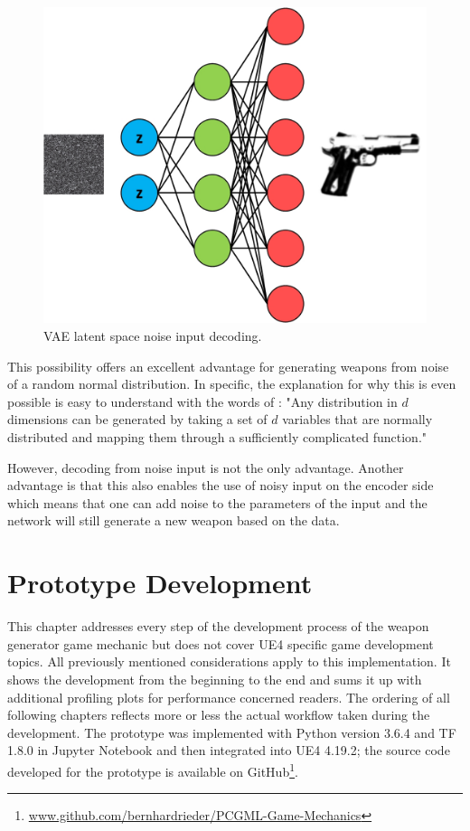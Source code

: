 \documentclass[MGS,Master,english]{twbook}%
\begin{document}
\begin{figure}[!htbp]
	\centering
	\includegraphics[width=0.7\linewidth]{PICs/NNs/variational_autoencoder_noise_decoding}
	\caption{\ac{VAE} latent space noise input decoding.} \label{fig::vae_noise_decoding}
\end{figure}

This possibility offers an excellent advantage for generating weapons from noise of a random normal distribution. In specific, the explanation for why this is even possible is easy to understand with the words of \citep[p. 6]{ml::vae::tutorial}: "Any distribution in $d$ dimensions can be generated by taking a set of $d$ variables that are normally distributed and mapping them through a sufficiently complicated function."

However, decoding from noise input is not the only advantage. Another advantage is that this also enables the use of noisy input on the encoder side which means that one can add noise to the parameters of the input and the network will still generate a new weapon based on the data. 


%
%
\clearpage
\chapter{Prototype Development}
This chapter addresses every step of the development process of the weapon generator game mechanic but does not cover \ac{UE4} specific game development topics. All previously mentioned considerations apply to this implementation. It shows the development from the beginning to the end and sums it up with additional profiling plots for performance concerned readers. The ordering of all following chapters reflects more or less the actual workflow taken during the development. The prototype was implemented with Python version 3.6.4 and \ac{TF} 1.8.0 in Jupyter Notebook and then integrated into \ac{UE4} 4.19.2; the source code developed for the prototype is available on GitHub\footnote{\url{www.github.com/bernhardrieder/PCGML-Game-Mechanics}}. 
\end{document}
